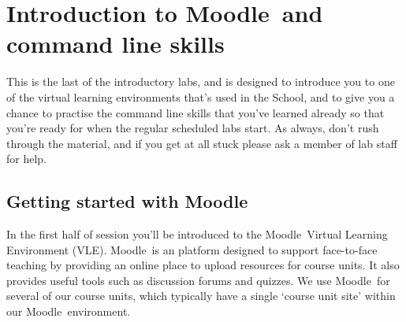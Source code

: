 
\renewcommand{\tilde}{\textasciitilde}
\newcommand{\moodle}{Moodle}
\newcommand{\Moodle}{Moodle}

\chapter[\Moodle\ Intro and command line skills]{Introduction to \Moodle\ and command line skills}

\minitoc



%
%
%
%
%
%


This is the last of the introductory labs, and is designed to
introduce you to one of the virtual learning environments that's used
in the School, and to give you a chance to practise the command line
skills that you've learned already so that you're ready for when the
regular scheduled labs start. As always, don't rush through
the material, and if you get at all stuck please ask a member of lab staff 
for help.

\section{Getting started with \moodle}
\label{sec:introduction-moodle}

In the first half of session you'll be introduced to the \moodle\ Virtual Learning Environment (VLE). \moodle\ is an  platform designed to support face-to-face teaching by providing an online place to upload resources for course units. It also provides useful tools such as discussion forums and quizzes. We use \moodle\ for several of our course units, which typically have a single `course unit site' within our \moodle\ environment.

